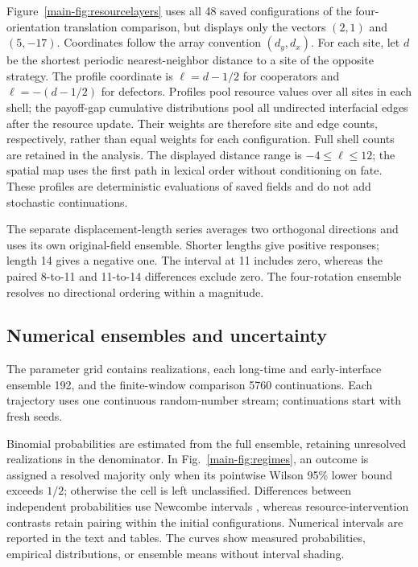 Figure~\ref{main-fig:resourcelayers} uses all 48 saved configurations of the four-orientation translation comparison, but displays only the vectors $(2,1)$ and $(5,-17)$. Coordinates follow the array convention $(d_y,d_x)$. For each site, let $d$ be the shortest periodic nearest-neighbor distance to a site of the opposite strategy. The profile coordinate is $\ell=d-1/2$ for cooperators and $\ell=-(d-1/2)$ for defectors. Profiles pool resource values over all sites in each shell; the payoff-gap cumulative distributions pool all undirected interfacial edges after the resource update. Their weights are therefore site and edge counts, respectively, rather than equal weights for each configuration. Full shell counts are retained in the analysis. The displayed distance range is $-4\le\ell\le12$; the spatial map uses the first path in lexical order without conditioning on fate. These profiles are deterministic evaluations of saved fields and do not add stochastic continuations.

The separate displacement-length series averages two orthogonal directions and uses its own original-field ensemble. Shorter lengths give positive responses; length 14 gives a negative one. The interval at 11 includes zero, whereas the paired 8-to-11 and 11-to-14 differences exclude zero. The four-rotation ensemble resolves no directional ordering within a magnitude.

\subsection{Numerical ensembles and uncertainty}

The parameter grid contains \PhaseRuns{} realizations, each long-time and early-interface ensemble 192, and the finite-window comparison 5760 continuations. Each trajectory uses one continuous random-number stream; continuations start with fresh seeds.

Binomial probabilities are estimated from the full ensemble, retaining unresolved realizations in the denominator. In Fig.~\ref{main-fig:regimes}, an outcome is assigned a resolved majority only when its pointwise Wilson 95\% lower bound \cite{wilson1927inference} exceeds $1/2$; otherwise the cell is left unclassified. Differences between independent probabilities use Newcombe intervals \cite{newcombe1998difference}, whereas resource-intervention contrasts retain pairing within the initial configurations. Numerical intervals are reported in the text and tables. The curves show measured probabilities, empirical distributions, or ensemble means without interval shading.

